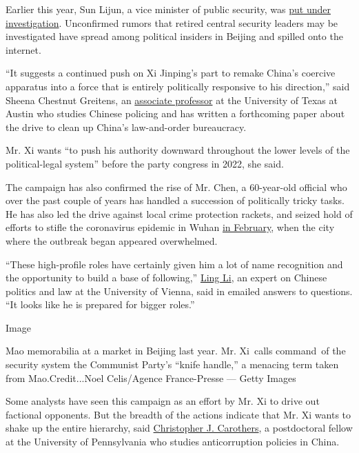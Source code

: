 Earlier this year, Sun Lijun, a vice minister of public security, was
\href{http://www.xinhuanet.com/english/2020-04/19/c_138990402.htm}{put
under investigation}. Unconfirmed rumors that retired central security
leaders may be investigated have spread among political insiders in
Beijing and spilled onto the internet.

``It suggests a continued push on Xi Jinping's part to remake China's
coercive apparatus into a force that is entirely politically responsive
to his direction,'' said Sheena Chestnut Greitens, an
\href{https://lbj.utexas.edu/greitens-sheena-chestnut}{associate
professor} at the University of Texas at Austin who studies Chinese
policing and has written a forthcoming paper about the drive to clean up
China's law-and-order bureaucracy.

Mr. Xi wants ``to push his authority downward throughout the lower
levels of the political-legal system'' before the party congress in
2022, she said.

The campaign has also confirmed the rise of Mr. Chen, a 60-year-old
official who over the past couple of years has handled a succession of
politically tricky tasks. He has also led the drive against local crime
protection rackets, and seized hold of efforts to stifle the coronavirus
epidemic in Wuhan
\href{https://www.scmp.com/news/china/politics/article/3050087/beijing-pins-hopes-guy-emperors-sword-restore-order-coronavirus}{in
February}, when the city where the outbreak began appeared overwhelmed.

``These high-profile roles have certainly given him a lot of name
recognition and the opportunity to build a base of following,''
\href{https://ufind.univie.ac.at/en/person.html?id=60055}{Ling Li}, an
expert on Chinese politics and law at the University of Vienna, said in
emailed answers to questions. ``It looks like he is prepared for bigger
roles.''

Image

Mao memorabilia at a market in Beijing last year. Mr. Xi~calls
command~of the security system the Communist Party's ``knife handle,'' a
menacing term taken from Mao.Credit...Noel Celis/Agence France-Presse
--- Getty Images

Some analysts have seen this campaign as an effort by Mr. Xi to drive
out factional opponents. But the breadth of the actions indicate that
Mr. Xi wants to shake up the entire hierarchy, said
\href{https://www.christopherjcarothers.com/}{Christopher J. Carothers},
a postdoctoral fellow at the University of Pennsylvania who studies
anticorruption policies in China.

